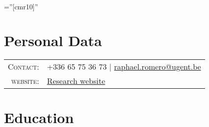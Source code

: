 \documentclass[a4paper,10pt]{article} %
\begin{document}
\pagestyle{empty} %

\font\fb=''[cmr10]'' %


\par{} %
\par{

\section{Personal Data}

\begin{tabular}{r|l}
	
	\textsc{Contact:} & +336 65 75 36 73  | \space \href{mailto:raphael.romero@ugent.be}{raphael.romero@ugent.be} \\
	\textsc{website:} & \href{https://rapharomero.github.io/}{Research website} \\
\end{tabular}


\section{Education}

}
\end{document}

